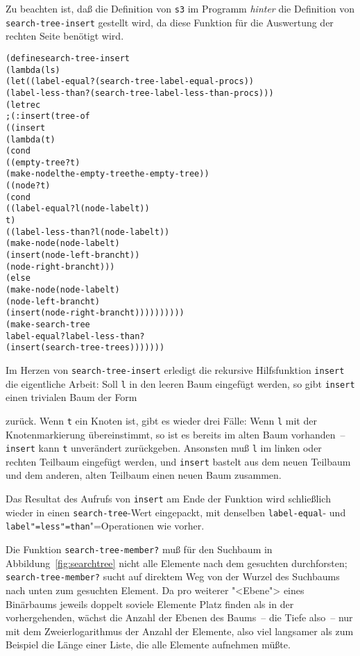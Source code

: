 %
Zu beachten ist, daß die Definition von \texttt{s3} im Programm
\emph{hinter} die Definition von \texttt{search-tree-insert} gestellt
wird, da diese Funktion für die Auswertung der rechten Seite benötigt wird.
%
\begin{alltt}
(define search-tree-insert
  (lambda (l s)
    (let ((label-equal? (search-tree-label-equal-proc s))
          (label-less-than? (search-tree-label-less-than-proc s)))
      (letrec
          ; (: insert (tree-of %a) -> (tree-of %a))
          ((insert
            (lambda (t)
              (cond
               ((empty-tree? t)
                (make-node l the-empty-tree the-empty-tree))
               ((node? t)
                (cond
                  ((label-equal? l (node-label t))
                   t)
                  ((label-less-than? l (node-label t))
                   (make-node (node-label t)
                              (insert (node-left-branch t))
                              (node-right-branch t)))
                  (else
                   (make-node (node-label t)
                              (node-left-branch t)
                              (insert (node-right-branch t))))))))))
        (make-search-tree
         label-equal? label-less-than?
         (insert (search-tree-tree s)))))))
\end{alltt}
%
Im Herzen von \texttt{search-tree-insert} erledigt die rekursive
Hilfsfunktion \texttt{insert} die eigentliche Arbeit: Soll
\texttt{l} in den leeren Baum eingefügt werden, so gibt
\texttt{insert} einen trivialen Baum der Form
%
\begin{pspdf}
\begin{center}
    {\Tdot\Tdot}
\end{center}
\end{pspdf}
% 
zurück.  Wenn \texttt{t} ein Knoten ist, gibt es wieder drei Fälle:
Wenn \texttt{l} mit der
Knotenmarkierung übereinstimmt, so ist es bereits im alten Baum
vorhanden~-- \texttt{insert} kann \texttt{t} unverändert
zurückgeben.  Ansonsten muß
\texttt{l} im linken oder rechten Teilbaum eingefügt werden,
und \texttt{insert} bastelt aus dem neuen Teilbaum und dem anderen, alten Teilbaum
einen neuen Baum zusammen.

Das Resultat des Aufrufs von \texttt{insert} am Ende der Funktion wird
schließlich wieder in einen \texttt{search-tree}-Wert eingepackt,
mit denselben \texttt{label-equal}- und \texttt{label"=less"=than}"=Operationen wie vorher.

Die Funktion \texttt{search-tree-member?} muß für den Suchbaum in
Abbildung~\ref{fig:searchtree} nicht alle Elemente nach dem gesuchten
durchforsten; \texttt{search-tree-member?} sucht auf direktem Weg
von der Wurzel des Suchbaums nach unten zum gesuchten Element.  Da pro
weiterer "<Ebene"> eines Binärbaums jeweils doppelt soviele Elemente
Platz finden als in der vorhergehenden, wächst die Anzahl der Ebenen
des Baums~-- die Tiefe also~-- nur mit dem Zweierlogarithmus der
Anzahl der Elemente, also viel langsamer als zum Beispiel die Länge
einer Liste, die alle Elemente aufnehmen müßte.

